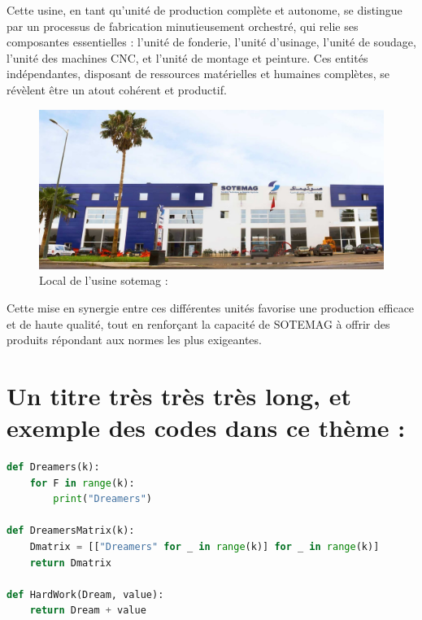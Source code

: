 \documentclass[a4paper, 11pt, openany]{report}
\begin{document}
Cette usine, en tant qu'unité de production complète et autonome, se distingue par un processus de fabrication minutieusement orchestré, qui relie ses composantes essentielles : l'unité de fonderie, l'unité d'usinage, l'unité de soudage, l'unité des machines CNC, et l'unité de montage et peinture. Ces entités indépendantes, disposant de ressources matérielles et humaines complètes, se révèlent être un atout cohérent et productif.

\begin{figure}[H]
\centering
\includegraphics[scale=0.15]{asset/LocalSotemag.png}
\caption{Local de l'usine sotemag :}    
\end{figure}

Cette mise en synergie entre ces différentes unités favorise une production efficace et de haute qualité, tout en renforçant la capacité de SOTEMAG à offrir des produits répondant aux normes les plus exigeantes.
\setcounter{chapter}{2}
\chapter{Un titre très très très long, et exemple des codes dans ce thème :}

\begin{Code}
\begin{lstlisting}[language=python]
def Dreamers(k):
    for F in range(k):
        print("Dreamers")

def DreamersMatrix(k):
    Dmatrix = [["Dreamers" for _ in range(k)] for _ in range(k)]
    return Dmatrix

def HardWork(Dream, value):
    return Dream + value
\end{lstlisting}

\end{Code}
\end{document}
